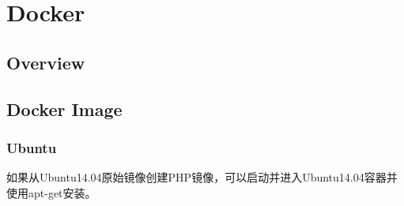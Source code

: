 \part{Docker}


\chapter{Overview}




\chapter{Docker Image}



\section{Ubuntu}


如果从Ubuntu14.04原始镜像创建PHP镜像，可以启动并进入Ubuntu14.04容器并使用apt-get安装。


